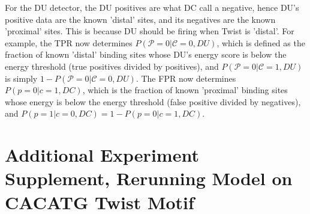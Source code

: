 For the DU detector, the DU positives are what DC call a negative, hence DU's positive data are the known 'distal' sites, and its negatives are the known 'proximal' sites.  This is because DU should be firing when Twist is 'distal'.  For example, the TPR now determines $P(\mathcal P=0|\mathcal C=0,DU)$, which is defined as the fraction of known 'distal' binding sites whose DU's energy score is below the energy threshold (true positives divided by positives), and $P(\mathcal P=0|\mathcal C=1,DU)$ is simply $1-P(\mathcal P=0|\mathcal C=0,DU)$.  The FPR now determines $P(p=0|c=1,DC)$, which is the fraction of known 'proximal' binding sites whose energy is below the energy threshold (false positive divided by negatives), and $P(p=1|c=0,DC)=1-P(p=0|c=1,DC)$. 



  
 
\section{Additional Experiment Supplement, Rerunning Model on CACATG Twist Motif}

